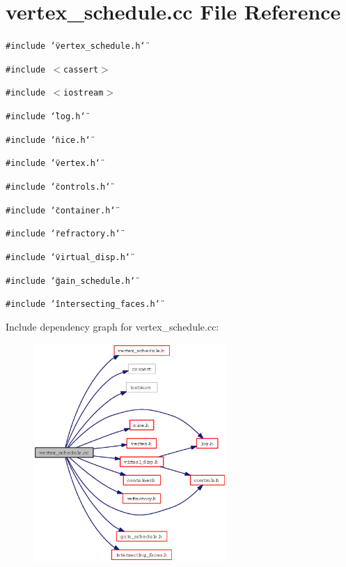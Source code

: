 \section{vertex\_\-schedule.cc File Reference}
\label{vertex__schedule_8cc}
{\tt \#include \char`\"{}vertex\_\-schedule.h\char`\"{}}\par
{\tt \#include $<$cassert$>$}\par
{\tt \#include $<$iostream$>$}\par
{\tt \#include \char`\"{}log.h\char`\"{}}\par
{\tt \#include \char`\"{}nice.h\char`\"{}}\par
{\tt \#include \char`\"{}vertex.h\char`\"{}}\par
{\tt \#include \char`\"{}controls.h\char`\"{}}\par
{\tt \#include \char`\"{}container.h\char`\"{}}\par
{\tt \#include \char`\"{}refractory.h\char`\"{}}\par
{\tt \#include \char`\"{}virtual\_\-disp.h\char`\"{}}\par
{\tt \#include \char`\"{}gain\_\-schedule.h\char`\"{}}\par
{\tt \#include \char`\"{}intersecting\_\-faces.h\char`\"{}}\par


Include dependency graph for vertex\_\-schedule.cc:\begin{figure}[H]
\begin{center}
\leavevmode
\includegraphics[width=208pt]{vertex__schedule_8cc__incl}
\end{center}
\end{figure}
